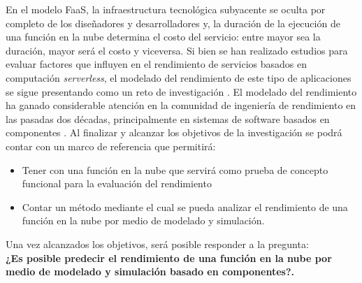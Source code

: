 En el modelo FaaS, la infraestructura tecnológica subyacente se oculta por completo de los diseñadores y desarrolladores y, la duración de la ejecución de una función en la nube determina el costo del servicio: entre mayor sea la duración, mayor será el costo y viceversa. Si bien se han realizado estudios \cite{8360324} para evaluar factores que influyen en el rendimiento de servicios basados en computación \emph{serverless}, el modelado del rendimiento de este tipo de aplicaciones se sigue presentando como un reto de investigación \cite{Heinrich:2017:PEM:3053600.3053653}. El modelado del rendimiento ha ganado considerable atención en la comunidad de ingeniería de rendimiento en las pasadas dos décadas, principalmente en sistemas de software basados en componentes \cite{Koziolek:2010:PEC:1808359.1808729}. Al finalizar y alcanzar los objetivos de la investigación se podrá contar con un marco de referencia que permitirá:
\begin{itemize}
    \item Tener con una función en la nube que servirá como prueba de concepto funcional para la evaluación del rendimiento
    \item Contar un método mediante el cual se pueda analizar el rendimiento de una función en la nube por medio de modelado y simulación.
\end{itemize}


Una vez alcanzados los objetivos, será posible responder a la pregunta:\\
\textbf{¿Es posible predecir el rendimiento de una función en la nube por medio de modelado y simulación basado en componentes?.}